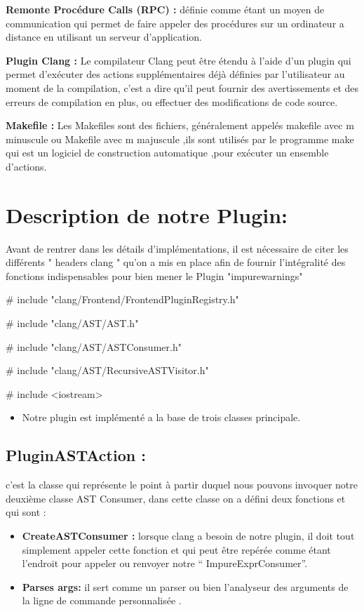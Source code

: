\documentclass[12pt,titlepage]{article}
\begin{document}
\textbf{ Remonte Procédure Calls (RPC) : } définie comme étant un moyen de communication qui permet de faire appeler des procédures sur un ordinateur a distance en utilisant un serveur d'application.\cite{wiki}

\textbf{Plugin Clang :} Le compilateur Clang peut être étendu à l'aide d'un plugin qui permet d'exécuter des actions supplémentaires déjà définies par l'utilisateur au moment de la compilation\cite{ClangTeam}, c'est a dire qu'il peut fournir des avertissements et des erreurs de compilation en plus, ou effectuer des modifications de code source.\cite{clang}

\textbf{Makefile :} Les Makefiles sont des fichiers, généralement appelés makefile avec m minuscule ou Makefile avec m majuscule ,ils sont utilisés par le programme make qui est un logiciel de construction automatique ,pour exécuter un ensemble d'actions.\cite{makefile}

\section{Description de notre Plugin:}
Avant de rentrer dans les détails d’implémentations, il est nécessaire de citer les différents " headers clang " qu’on a mis en place afin de fournir l’intégralité des fonctions indispensables pour bien mener le Plugin "impurewarnings"

\# include "clang/Frontend/FrontendPluginRegistry.h"

\# include "clang/AST/AST.h"

\# include "clang/AST/ASTConsumer.h"

\# include "clang/AST/RecursiveASTVisitor.h"

\# include <iostream>
\begin{itemize}
    \item Notre plugin est implémenté a la base de trois classes principale.
\end{itemize}

\subsection{PluginASTAction :}
c’est la classe qui représente le point à partir duquel nous pouvons invoquer notre deuxième classe AST Consumer, dans cette classe on a défini deux fonctions et qui sont : 
\begin{itemize}
    \item \textbf{CreateASTConsumer :} lorsque clang a besoin de notre plugin, il doit tout simplement appeler cette fonction et qui peut être repérée comme étant l’endroit pour appeler ou renvoyer notre “ ImpureExprConsumer”. 

  \item \textbf{Parses args:} il sert comme un parser ou bien l’analyseur des arguments de la ligne de commande personnalisée .
\end{itemize}
\end{document}
